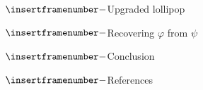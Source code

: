 \documentclass[10pt]{beamer}
\theoremstyle{plain}
\theoremstyle{example}
\begin{document}
\begin{frame}{$\insertframenumber -$Upgraded lollipop}
\end{frame}
\begin{frame}{$\insertframenumber -$Recovering $\varphi$ from $\psi$}
\end{frame}
\begin{frame}{$\insertframenumber -$Conclusion}
		
\end{frame}
\begin{frame}{$\insertframenumber -$References}
				
				
\end{frame}
\end{document}
